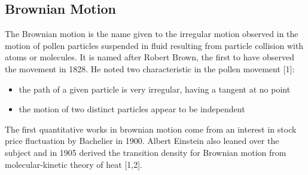\documentclass[12pt,twoside]{reedthesis}
\theoremstyle{definition}
\theoremstyle{definition}
\theoremstyle{remark}
\begin{document}
  \subsection{Brownian Motion}\label{brownian-motion}
  
  The Brownian motion is the name given to the irregular motion observed
  in the motion of pollen particles suspended in fluid resulting from
  particle collision with atoms or molecules. It is named after Robert
  Brown, the first to have observed the movement in 1828. He noted two
  characteristic in the pollen movement {[}1{]}:
  \begin{itemize}
  \item
    the path of a given particle is very irregular, having a tangent at no
    point
  \item
    the motion of two distinct particles appear to be independent
  \end{itemize}
  The first quantitative works in brownian motion come from an interest in
  stock price fluctuation by Bachelier in 1900. Albert Einstein also
  leaned over the subject and in 1905 derived the transition density for
  Brownian motion from molecular-kinetic theory of heat {[}1,2{]}.
  
\end{document}
